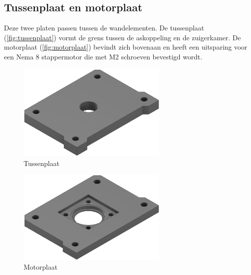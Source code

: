 \subsection{Tussenplaat en motorplaat}
Deze twee platen passen tussen de wandelementen. De tussenplaat (\autoref{fig:tussenplaat}) vormt de grens tussen de askoppeling en de zuigerkamer. De motorplaat (\autoref{fig:motorplaat}) bevindt zich bovenaan en heeft een uitsparing voor een Nema 8 stappermotor die met M2 schroeven bevestigd wordt. 
\\[12pt]\begin{minipage}[t]{0.49\textwidth}
    \vspace{0pt}
    \begin{figure}[H]
        \centering
        \includegraphics[width=0.65\textwidth]{figures/Topp_Wall_w.png}
        \caption{Tussenplaat}\label{fig:tussenplaat}
    \end{figure}
\end{minipage}
\begin{minipage}[t]{0.49\textwidth}
    \vspace{0pt}
    \begin{figure}[H]
        \centering
        \includegraphics[width=0.65\textwidth]{figures/motor_mount_wide.png}
        \caption{Motorplaat}\label{fig:motorplaat}
    \end{figure}
\end{minipage}\\

